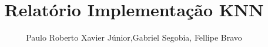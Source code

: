 \documentclass[a4paper,11pt]{article}
\begin{document}
\title{Relatório Implementação KNN}
\author{Paulo Roberto Xavier Júnior,Gabriel Segobia, Fellipe Bravo}
\def\email{contato.pauloxavier@gmail.com,segobia.gos@gmail.com,fellipe.bravo@gmail.com}
\def\handindate{14/11/2016}

\maketitle





\end{document}
